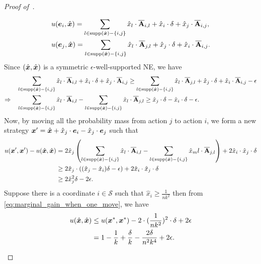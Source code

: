 \begin{proof}[Proof of~]
\begin{itemize}
    \begin{align*}
        & u({\bm{e}}_i, \hat{{\bm{x}}}) = \sum_{l \in \text{supp}(\hat{{\bm{x}}}) - \{i, j\}} \hat{x}_l \cdot \overline{\mathbf{A}}_{i, l} + \hat{x}_i \cdot \delta + \hat{x}_j  \cdot \overline{\mathbf{A}}_{i, j}, \\
        &u({\bm{e}}_j, \hat{{\bm{x}}}) = \sum_{l \in \text{supp}(\hat{{\bm{x}}}) - \{i, j\}} \hat{x}_l \cdot \overline{\mathbf{A}}_{j, l} + \hat{x}_j \cdot \delta + \hat{x}_i  \cdot \overline{\mathbf{A}}_{i, j}.
    \end{align*}
    Since $(\hat{{\bm{x}}}, \hat{{\bm{x}}})$ is a symmetric $\epsilon$-well-supported NE, we have
    \begin{align*}
        & \sum_{l \in \text{supp}(\hat{{\bm{x}}}) - \{i, j\}} \hat{x}_l \cdot \overline{\mathbf{A}}_{i, l} + \hat{x}_i \cdot \delta + \hat{x}_j  \cdot\overline{\mathbf{A}}_{i, j} \geq \sum_{l \in \text{supp}(\hat{{\bm{x}}}) - \{i, j\}} \hat{x}_l \cdot \overline{\mathbf{A}}_{j, l} + \hat{x}_j \cdot \delta + \hat{x}_i  \cdot \overline{\mathbf{A}}_{i, j} - \epsilon\\
        \Rightarrow \quad & \sum_{l \in \text{supp}(\hat{{\bm{x}}}) - \{i, j\}} \hat{x}_l \cdot \overline{\mathbf{A}}_{i, l}  - \sum_{l \in \text{supp}(\hat{{\bm{x}}}) - \{i, j\}} \hat{x}_l \cdot \overline{\mathbf{A}}_{j, l}   \geq \hat{x}_j \cdot \delta - \hat{x}_i \cdot \delta - \epsilon.
    \end{align*}
    Now, by moving all the probability mass from action $j$ to action $i$, we form a new strategy ${\bm{x}}' = \hat{{\bm{x}}} + \hat{x}_j \cdot {\bm{e}}_i - \hat{x}_j \cdot {\bm{e}}_j $ such that
    \begin{align}
        u({\bm{x}}', {\bm{x}}') - u(\hat{{\bm{x}}}, \hat{{\bm{x}}}) &=  2 \hat{x}_j\left(\sum_{l \in \text{supp}(\hat{{\bm{x}}}) - \{i ,j\}} \hat{x}_l \cdot \overline{\mathbf{A}}_{i, l} - \sum_{l \in \text{supp}(\hat{{\bm{x}}}) - \{i ,j\}} \hat{x}_ml\cdot \overline{\mathbf{A}}_{j, l}\right) + 2 \hat{x}_i \cdot \hat{x}_j \cdot \delta \notag \\
        & \geq  2 \hat{x}_j \cdot ((\hat{x}_j - \hat{x}_i) \delta - \epsilon)+ 2 \hat{x}_i \cdot\hat{x}_j \cdot \delta \notag \\
        & \geq 2 {\hat{x}_j}^2 \delta - 2 \epsilon \label{eq:marginal_gain_when_one_move}. 
    \end{align}
        Suppose there is a coordinate $i \in \mathcal{S}$ such that $\hat{x}_i \geq \frac{1}{nk^2}$ then from \eqref{eq:marginal_gain_when_one_move}, we have 
        \begin{align*}
            u(\hat{\vx}, \hat{\vx}) &\leq u(\vx^*, \vx^*) - 2\cdot(\frac{1}{nk^2})^2 \cdot \delta + 2 \epsilon\\
            & = 1 - \frac{1}{k} + \frac{\delta}{k} - \frac{2\delta}{ n^2k^4} + 2 \epsilon.

\end{align*}
\end{itemize}
\end{proof}
